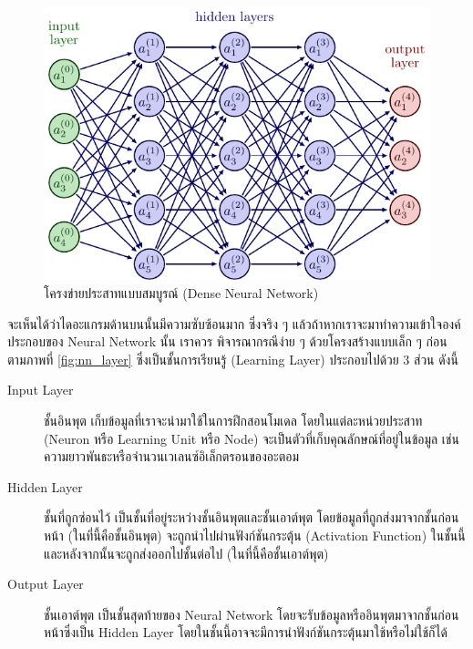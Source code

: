\begin{figure}[H]
    \includegraphics[width=\linewidth]{fig/dense_neural_net.pdf}
    \caption{โครงข่ายประสาทแบบสมบูรณ์ (Dense Neural Network)}
    \label{fig:dense_neural_net}
\end{figure}

จะเห็นได้ว่าไดอะแกรมด้านบนนั้นมีความซับซ้อนมาก ซึ่งจริง ๆ แล้วถ้าหากเราจะมาทำความเข้าใจองค์ประกอบของ Neural Network นั้น เราควร%
พิจารณากรณีง่าย ๆ ด้วยโครงสร้างแบบเล็ก ๆ ก่อน ตามภาพที่ \ref{fig:nn_layer} ซึ่งเป็นชั้นการเรียนรู้ (Learning Layer) ประกอบไปด้วย
3 ส่วน ดังนี้

\begin{description}
    \item[Input Layer] ชั้นอินพุต เก็บข้อมูลที่เราจะนำมาใช้ในการฝึกสอนโมเดล โดยในแต่ละหน่วยประสาท (Neuron หรือ Learning Unit 
    หรือ Node) จะเป็นตัวที่เก็บคุณลักษณ์ที่อยู่ในข้อมูล เช่น ความยาวพันธะหรือจำนวนเวเลนซ์อิเล็กตรอนของอะตอม
    
    \item[Hidden Layer] ชั้นที่ถูกซ่อนไว้ เป็นชั้นที่อยู่ระหว่างชั้นอินพุตและชั้นเอาต์พุต โดยข้อมูลที่ถูกส่งมาจากชั้นก่อนหน้า (ในที่นี้คือชั้นอินพุต)
    จะถูกนำไปผ่านฟังก์ชันกระตุ้น (Activation Function) ในชั้นนี้ และหลังจากนั้นจะถูกส่งออกไปชั้นต่อไป (ในที่นี้คือชั้นเอาต์พุต)
    
    \item[Output Layer] ชั้นเอาต์พุต เป็นชั้นสุดท้ายของ Neural Network โดยจะรับข้อมูลหรืออินพุตมาจากชั้นก่อนหน้าซึ่งเป็น Hidden 
    Layer โดยในชั้นนี้อาจจะมีการนำฟังก์ชันกระตุ้นมาใช้หรือไม่ใช้ก็ได้
\end{description}

